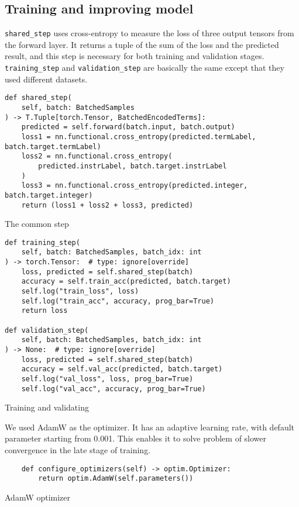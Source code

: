 \subsection{Training and improving model}
\label{sec:train}
\texttt{shared\_step} uses cross-entropy to measure the loss of three output tensors from the forward layer. It returns a tuple of the sum of the loss and the predicted result, and this step is necessary for both training and validation stages. \texttt{training\_step} and \texttt{validation\_step} are basically the same except that they used different datasets. 

\begin{listing}[H]
\begin{verbatim}
def shared_step(
    self, batch: BatchedSamples
) -> T.Tuple[torch.Tensor, BatchedEncodedTerms]:
    predicted = self.forward(batch.input, batch.output)
    loss1 = nn.functional.cross_entropy(predicted.termLabel, batch.target.termLabel)
    loss2 = nn.functional.cross_entropy(
        predicted.instrLabel, batch.target.instrLabel
    )
    loss3 = nn.functional.cross_entropy(predicted.integer, batch.target.integer)
    return (loss1 + loss2 + loss3, predicted)
\end{verbatim}
\caption{The common step}
\end{listing}

\begin{listing}[H]
\begin{verbatim}
def training_step(
    self, batch: BatchedSamples, batch_idx: int
) -> torch.Tensor:  # type: ignore[override]
    loss, predicted = self.shared_step(batch)
    accuracy = self.train_acc(predicted, batch.target)
    self.log("train_loss", loss)
    self.log("train_acc", accuracy, prog_bar=True)
    return loss

def validation_step(
    self, batch: BatchedSamples, batch_idx: int
) -> None:  # type: ignore[override]
    loss, predicted = self.shared_step(batch)
    accuracy = self.val_acc(predicted, batch.target)
    self.log("val_loss", loss, prog_bar=True)
    self.log("val_acc", accuracy, prog_bar=True)
\end{verbatim}
\caption{Training and validating}
\end{listing}

We used AdamW \cite{adamW} as the optimizer. It has an adaptive learning rate, with default parameter starting from 0.001. This enables it to solve problem of slower convergence in the late stage of training.
\begin{listing}[H]
\begin{verbatim}
    def configure_optimizers(self) -> optim.Optimizer:
        return optim.AdamW(self.parameters())
\end{verbatim}
\caption{AdamW optimizer}
\end{listing}

